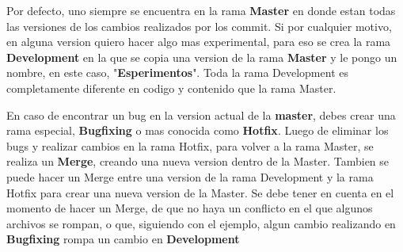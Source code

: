 \documentclass[]{article} %
\begin{document}
Por defecto, uno siempre se encuentra en la rama \textbf{Master} en donde estan todas las versiones de los cambios realizados por los commit. Si por cualquier motivo, en alguna version quiero hacer algo mas experimental, para eso se crea la rama \textbf{Development} en la que se copia una version de la rama \textbf{Master} y le pongo un nombre, en este caso, "\textbf{Esperimentos}". Toda la rama Development es completamente diferente en codigo y contenido que la rama Master.

En caso de encontrar un bug en la version actual de la \textbf{master}, debes crear una rama especial, \textbf{Bugfixing} o mas conocida como \textbf{Hotfix}. Luego de eliminar los bugs y realizar cambios en la rama Hotfix, para volver a la rama Master, se realiza un \textbf{Merge}, creando una nueva version dentro de la Master. Tambien se puede hacer un Merge entre una version de la rama Development y la rama Hotfix para crear una nueva version de la Master.
Se debe tener en cuenta en el momento de hacer un Merge, de que no haya un conflicto en el que algunos archivos se rompan, o que, siguiendo con el ejemplo, algun cambio realizando en \textbf{Bugfixing} rompa un cambio en \textbf{Development} 
\end{document}
